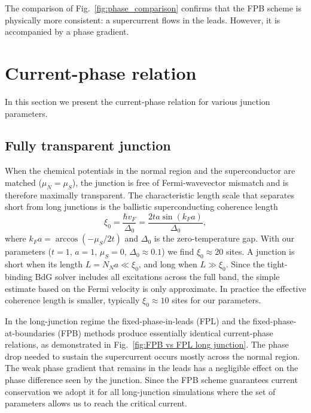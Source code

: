 \documentclass[11pt,a4paper,twoside,openany]{report}
\begin{document}
The comparison of Fig.~\ref{fig:phase_comparison} confirms that the FPB scheme is physically more consistent: a supercurrent flows in the leads. However, it is accompanied by a phase gradient.



\section{Current-phase relation}


In this section we present the current-phase relation for various junction parameters.


\subsection{Fully transparent junction}

When the chemical potentials in the normal region and the superconductor are matched
($\mu_N=\mu_S$), the junction is free of Fermi-wavevector mismatch and is
therefore maximally transparent. The characteristic length scale that separates
short from long junctions is the ballistic superconducting coherence length
\begin{equation}
  \xi_0 = \frac{\hbar v_F}{\Delta_0}
        = \frac{2 t a \sin(k_F a)}{\Delta_0},
  \label{eq:xi0}
\end{equation}
where $k_F a = \arccos(-\mu_S/2t)$ and $\Delta_0$ is the zero-temperature gap. With our parameters ($t=1$, $a=1$, $\mu_S=0$, $\Delta_0\approx 0.1$) we find $\xi_0 \approx 20$ sites.  A junction is short when its length $L = N_N a \ll \xi_0$, and long when $L \gg \xi_0$. Since the tight-binding BdG solver includes all excitations across the full band, the simple estimate based on the Fermi velocity is only approximate. In practice the effective coherence length is smaller, typically $\xi_0\approx 10$ sites for our parameters.

In the long-junction regime the fixed-phase-in-leads (FPL) and the
fixed-phase-at-boundaries (FPB) methods produce essentially identical
current-phase relations, as demonstrated in Fig.~\ref{fig:FPB vs FPL long junction}. The phase drop needed to sustain the supercurrent occurs mostly across the normal region. The weak phase gradient that remains in the leads has a negligible effect on the phase difference seen by the junction. Since the FPB scheme guarantees current conservation we adopt it for all long-junction simulations where the set of parameters allows us to reach the critical current.
\end{document}
